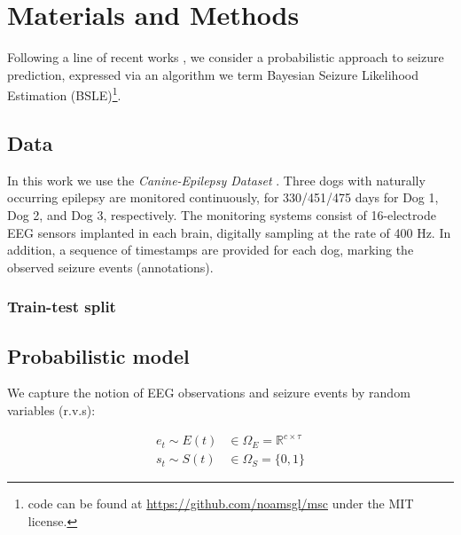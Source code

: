 
\chapter{Materials and Methods}
\label{ch:3methods}


Following a line of recent works \cite{karoly2017circadian, baud2018multi, baud2020chance}, we consider a probabilistic approach to seizure prediction, expressed via an algorithm we term Bayesian Seizure Likelihood Estimation (BSLE)\footnote{code can be found at \url{https://github.com/noamsgl/msc} under the MIT license.}.


\section{Data}
In this work we use the \emph{Canine-Epilepsy Dataset} \cite{davis2011novel, kaggle2014contests}. Three dogs with naturally occurring epilepsy are monitored continuously, for 330/451/475 days for Dog 1, Dog 2, and Dog 3, respectively. The monitoring systems consist of 16-electrode EEG sensors implanted in each brain, digitally sampling at the rate of 400 Hz. In addition, a sequence of timestamps are provided for each dog, marking the observed seizure events (\aka annotations).



\subsection{Train-test split}

\section{Probabilistic model}
We capture the notion of EEG observations and seizure events by random variables (r.v.s):

\begin{align}
	 e_t \sim E(t) &\in \Omega_E = \mathbb{R}^{c \times \tau}\\
	 s_t \sim S(t) &\in \Omega_S = \{0, 1\}
\end{align}

